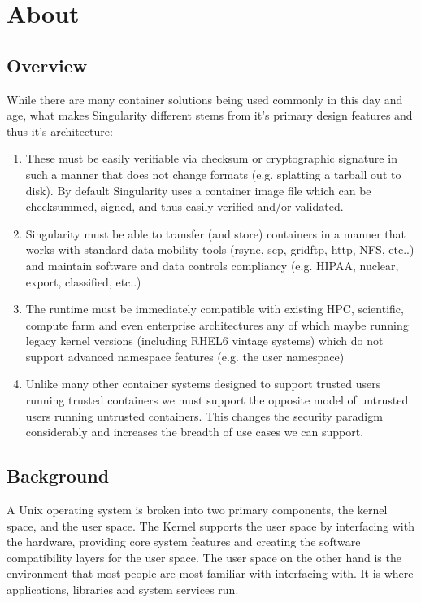 \documentclass[letterpaper,10pt,english]{sphinxmanual}
\begin{document}
\section{About}
\label{\detokenize{introduction:about}}

\subsection{Overview}
\label{\detokenize{introduction:overview}}
While there are many container solutions being used commonly in this day and age, what makes Singularity different stems from it’s primary design features and thus it’s architecture:
\begin{enumerate}
\item {} 
 These must be easily verifiable via checksum or cryptographic signature in such a manner that does not change formats (e.g. splatting a tarball out to disk). By default Singularity uses a container image file which can be checksummed, signed, and thus easily verified and/or validated.

\item {} 
 Singularity must be able to transfer (and store) containers in a manner that works with standard data mobility tools (rsync, scp, gridftp, http, NFS, etc..) and maintain software and data controls compliancy (e.g. HIPAA, nuclear, export, classified, etc..)

\item {} 
 The runtime must be immediately compatible with existing HPC, scientific, compute farm and even enterprise architectures any of which maybe running legacy kernel versions (including RHEL6 vintage systems) which do not support advanced namespace features (e.g. the user namespace)

\item {} 
 Unlike many other container systems designed to support trusted users running trusted containers we must support the opposite model of untrusted users running untrusted containers. This changes the security paradigm considerably and increases the breadth of use cases we can support.

\end{enumerate}


\subsection{Background}
\label{\detokenize{introduction:background}}
A Unix operating system is broken into two primary components, the kernel space, and the user space. The Kernel supports the user space by interfacing with the hardware, providing core system features and creating the software compatibility layers for the user space. The user space on the other hand is the environment that most people are most familiar with interfacing with. It is where applications, libraries and system services run.
\end{document}

